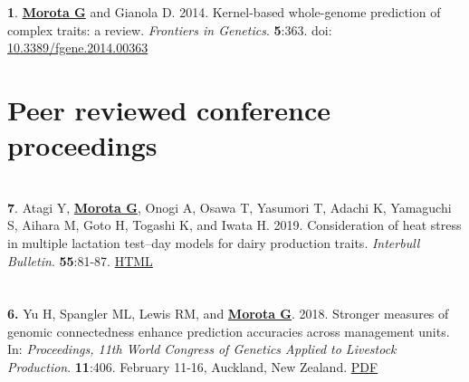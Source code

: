 \documentclass[margin,line,10pt]{res}
\newenvironment{list1}{
  \begin{list}{\ding{113}}{%
      \setlength{\itemsep}{0in}
      \setlength{\parsep}{0in} \setlength{\parskip}{0in}
      \setlength{\topsep}{0in} \setlength{\partopsep}{0in} 
      \setlength{\leftmargin}{0.17in}}}{\end{list}}
\begin{document}
\begin{resume}
\begin{list1}
\end{list1}


\section{}
\begin{list1}

 \item [{\bf 1}.]  {\bf \underline{Morota G}} and Gianola D. 2014. 
  Kernel-based whole-genome prediction of complex traits: a review. \emph{Frontiers in Genetics}. {\bf 5}:363. doi: \textcolor{blue}{\href{http://dx.doi.org/10.3389/fgene.2014.00363}{10.3389/fgene.2014.00363}} 

\end{list1}




\vspace{1.0cm}
\section{\sc Peer reviewed conference proceedings}
\vspace{1.5cm}

\section{}
\begin{list1}

\item [{\bf 7}.] Atagi Y, {\bf \underline{Morota G}}, Onogi A, Osawa T, Yasumori T, Adachi K, Yamaguchi S, Aihara M, Goto H, Togashi K, and Iwata H. 2019. Consideration of heat stress in multiple lactation test–day models for dairy production traits. \emph{Interbull Bulletin}. \textbf{55}:81-87. \textcolor{blue}{\href{https://journal.interbull.org/index.php/ib/article/view/1467}{HTML}}

\end{list1}


\section{}
\begin{list1}
  
\item [\bf{6}.] Yu H, Spangler ML, Lewis RM, and {\bf \underline{Morota G}}. 2018. 
Stronger measures of genomic connectedness enhance prediction accuracies across management units. In: \emph{Proceedings, 11th World Congress of Genetics Applied to Livestock Production}. \textbf{11}:406. February 11-16, Auckland, New Zealand. 
\textcolor{blue}{\href{http://www.wcgalp.org/proceedings/2018/stronger-measures-genomic-connectedness-enhance-prediction-accuracies-across}{PDF}}


\end{list1}
\end{resume}
\end{document}
